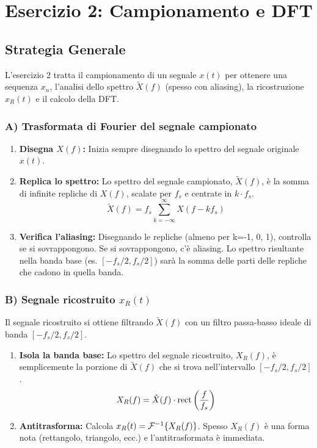 \chapter{Esercizio 2: Campionamento e DFT}

\section{Strategia Generale}
L'esercizio 2 tratta il campionamento di un segnale $x(t)$ per ottenere una sequenza $x_n$, l'analisi dello spettro $\tilde{X}(f)$ (spesso con aliasing), la ricostruzione $x_R(t)$ e il calcolo della DFT.

\subsection{A) Trasformata di Fourier del segnale campionato}
\begin{enumerate}
    \item \textbf{Disegna $X(f)$:} Inizia sempre disegnando lo spettro del segnale originale $x(t)$.
    \item \textbf{Replica lo spettro:} Lo spettro del segnale campionato, $\tilde{X}(f)$, è la somma di infinite repliche di $X(f)$, scalate per $f_s$ e centrate in $k \cdot f_s$.
    $$ \tilde{X}(f) = f_s \sum_{k=-\infty}^{\infty} X(f - k f_s) $$
    \item \textbf{Verifica l'aliasing:} Disegnando le repliche (almeno per k=-1, 0, 1), controlla se si sovrappongono. Se si sovrappongono, c'è aliasing. Lo spettro risultante nella banda base (es. $[-f_s/2, f_s/2]$) sarà la somma delle parti delle repliche che cadono in quella banda.
\end{enumerate}

\subsection{B) Segnale ricostruito $x_R(t)$}
Il segnale ricostruito si ottiene filtrando $\tilde{X}(f)$ con un filtro passa-basso ideale di banda $[-f_s/2, f_s/2]$.
\begin{enumerate}
    \item \textbf{Isola la banda base:} Lo spettro del segnale ricostruito, $X_R(f)$, è semplicemente la porzione di $\tilde{X}(f)$ che si trova nell'intervallo $[-f_s/2, f_s/2]$.
    $$ X_R(f) = \tilde{X}(f) \cdot \text{rect}\left(\frac{f}{f_s}\right) $$
    \item \textbf{Antitrasforma:} Calcola $x_R(t) = \mathcal{F}^{-1}\{X_R(f)\}$. Spesso $X_R(f)$ è una forma nota (rettangolo, triangolo, ecc.) e l'antitrasformata è immediata.
\end{enumerate}


